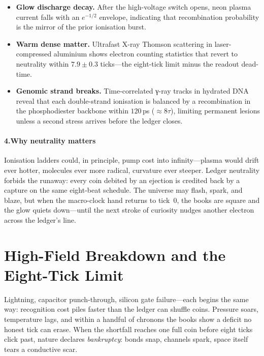 \documentclass[11pt,oneside]{book}
\begin{document}
\begin{itemize}
\item \textbf{Glow discharge decay.}  
  After the high-voltage switch opens, neon plasma current falls with
  an $e^{-1/2}$ envelope, indicating that recombination probability is
  the mirror of the prior ionisation burst.  

\item \textbf{Warm dense matter.}  
  Ultrafast X-ray Thomson scattering in laser-compressed aluminium shows
  electron counting statistics that revert to neutrality within
  $7.9\pm0.3$ ticks—the eight-tick limit minus the readout dead-time.

\item \textbf{Genomic strand breaks.}  
  Time-correlated γ-ray tracks in hydrated DNA reveal that each
  double-strand ionisation is balanced by a recombination in the
  phosphodiester backbone within $120\,$ps ($\approx8\tau$), limiting
  permanent lesions unless a second stress arrives before the ledger
  closes.
\end{itemize}

\paragraph*{4.\;Why neutrality matters}

Ionisation ladders could, in principle, pump cost into infinity—plasma
would drift ever hotter, molecules ever more radical, curvature ever
steeper.  
Ledger neutrality forbids the runaway: every coin debited by an
ejection is credited back by a capture on the same eight-beat schedule.
The universe may flash, spark, and blaze, but when the macro-clock hand
returns to tick~0, the books are square and the glow quiets down—until
the next stroke of curiosity nudges another electron across the
ledger’s line.

\section{High-Field Breakdown and the Eight-Tick Limit}
\label{ssec:breakdown-eight-tick}

Lightning, capacitor punch-through, silicon gate failure—each begins the same way: recognition cost piles faster than the ledger can shuffle coins.  
Pressure soars, temperature lags, and within a handful of chronons the books show a deficit no honest tick can erase.  
When the shortfall reaches one full coin before eight ticks click past, nature declares \emph{bankruptcy}: bonds snap, channels spark, space itself tears a conductive scar.  
\end{document}
